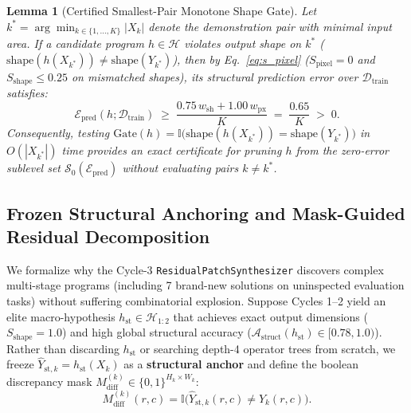 \documentclass[10pt,a4paper]{article}
\newtheorem{lemma}{Lemma}
\begin{document}
\begin{lemma}[Certified Smallest-Pair Monotone Shape Gate]
\label{lemma:smallest_pair}
Let $k^* = \arg\min_{k \in \{1,\dots,K\}} |X_k|$ denote the demonstration pair with minimal input area. If a candidate program $h \in \mathcal{H}$ violates output shape on $k^*$ ($\text{shape}(h(X_{k^*})) \neq \text{shape}(Y_{k^*})$), then by Eq.~\eqref{eq:s_pixel} ($S_{\text{pixel}} = 0$ and $S_{\text{shape}} \le 0.25$ on mismatched shapes), its structural prediction error over $\mathcal{D}_{\text{train}}$ satisfies:
\begin{equation}
\mathcal{E}_{\text{pred}}(h; \mathcal{D}_{\text{train}}) \;\ge\; \frac{0.75\,w_{\text{sh}} + 1.00\,w_{\text{px}}}{K} \;=\; \frac{0.65}{K} \;>\; 0.
\end{equation}
Consequently, testing $\text{Gate}(h) = \mathbb{I}\big(\text{shape}(h(X_{k^*})) = \text{shape}(Y_{k^*})\big)$ in $O(|X_{k^*}|)$ time provides an exact certificate for pruning $h$ from the zero-error sublevel set $\mathcal{S}_0(\mathcal{E}_{\text{pred}})$ without evaluating pairs $k \neq k^*$.
\end{lemma}

\subsection{Frozen Structural Anchoring and Mask-Guided Residual Decomposition}

We formalize why the Cycle-3 \texttt{ResidualPatchSynthesizer} discovers complex multi-stage programs (including 7 brand-new solutions on uninspected evaluation tasks) without suffering combinatorial explosion. Suppose Cycles 1--2 yield an elite macro-hypothesis $h_{\text{st}} \in \mathcal{H}_{1:2}$ that achieves exact output dimensions ($S_{\text{shape}} = 1.0$) and high global structural accuracy ($\mathcal{A}_{\text{struct}}(h_{\text{st}}) \in [0.78, 1.0)$). Rather than discarding $h_{\text{st}}$ or searching depth-4 operator trees from scratch, we freeze $\hat{Y}_{\text{st},k} = h_{\text{st}}(X_k)$ as a \textbf{structural anchor} and define the boolean discrepancy mask $M_{\text{diff}}^{(k)} \in \{0, 1\}^{H_k \times W_k}$:
\begin{equation}
M_{\text{diff}}^{(k)}(r, c) = \mathbb{I}\big(\hat{Y}_{\text{st},k}(r, c) \neq Y_k(r, c)\big).
\end{equation}
\end{document}
